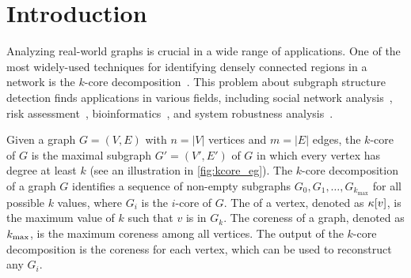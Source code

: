 \section{Introduction}\label{sec:intro}
Analyzing real-world graphs is crucial in a wide range of applications.
One of the most widely-used techniques for identifying densely connected regions in a network is the $k$-core decomposition~\cite{seidman1983network,matula1983smallest}.
This problem about subgraph structure detection finds applications in various fields, 
including social network analysis~\cite{kong2019k, zhang2017finding, kitsak2010identification,malliaros2020core, boguna2004models, giatsidis2011evaluating}, 
risk assessment~\cite{kong2019k, morone2019k, garcia2017ranking, malliaros2020core, burleson2020k, zhang2010using}, 
bioinformatics~\cite{kong2019k, wuchty2005peeling, malliaros2020core, cheng2013local, emerson2015k}, 
and system robustness analysis~\cite{kong2019k, malliaros2020core, burleson2020k, yao2022study, sun2020new}.

Given a graph $G = (V, E)$ with $n=|V|$ vertices and $m=|E|$ edges, the $k$-core of $G$ is the maximal subgraph $G' = (V', E')$ of $G$ in which every vertex has degree at least $k$ (see an illustration in \cref{fig:kcore_eg}).
The $k$-core decomposition of a graph $G$ identifies a sequence of non-empty subgraphs $G_0, G_1, \ldots, G_{k_{\max}}$ for all possible $k$ values, where $G_i$ is the $i$-core of $G$. 
The  of a vertex, denoted as ${\kappa}[v]$, is the maximum value of $k$ such that $v$ is in $G_k$. 
The coreness of a graph, denoted as $k_{\max}$, is the maximum coreness among all vertices. 
The output of the $k$-core decomposition is the coreness for each vertex, which can be used to reconstruct any $G_i$. 

